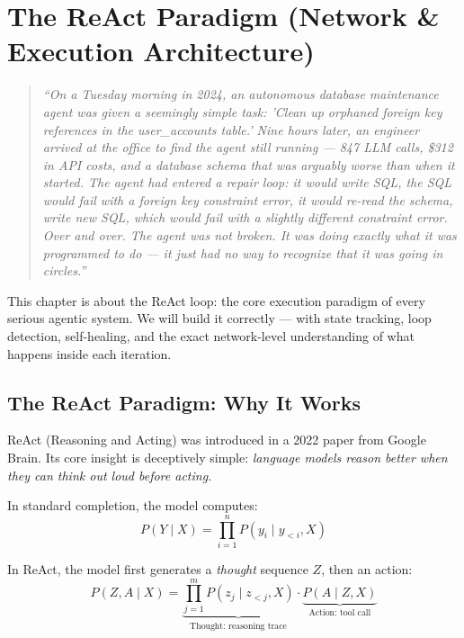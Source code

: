 \chapter{The ReAct Paradigm (Network \& Execution Architecture)}

\begin{quote}
\textit{``On a Tuesday morning in 2024, an autonomous database maintenance agent was given a seemingly simple task: 'Clean up orphaned foreign key references in the user\_accounts table.' Nine hours later, an engineer arrived at the office to find the agent still running — 847 LLM calls, \$312 in API costs, and a database schema that was arguably worse than when it started. The agent had entered a repair loop: it would write SQL, the SQL would fail with a foreign key constraint error, it would re-read the schema, write new SQL, which would fail with a slightly different constraint error. Over and over. The agent was not broken. It was doing exactly what it was programmed to do — it just had no way to recognize that it was going in circles.''}
\end{quote}

This chapter is about the ReAct loop: the core execution paradigm of every serious agentic system. We will build it correctly — with state tracking, loop detection, self-healing, and the exact network-level understanding of what happens inside each iteration.

\section{The ReAct Paradigm: Why It Works}

ReAct (Reasoning and Acting) was introduced in a 2022 paper from Google Brain. Its core insight is deceptively simple: \textit{language models reason better when they can think out loud before acting.}

In standard completion, the model computes:
\begin{equation}
P(Y \mid X) = \prod_{i=1}^n P(y_i \mid y_{<i}, X)
\end{equation}

In ReAct, the model first generates a \textit{thought} sequence $Z$, then an action:
\begin{equation}
P(Z, A \mid X) = \underbrace{\prod_{j=1}^m P(z_j \mid z_{<j}, X)}_{\text{Thought: reasoning trace}} \cdot \underbrace{P(A \mid Z, X)}_{\text{Action: tool call}}
\end{equation}

